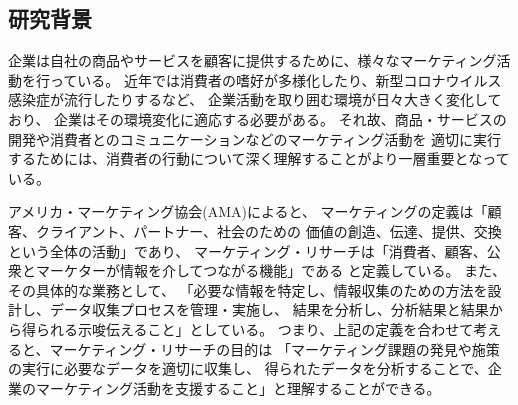 
\subsection{研究背景}

企業は自社の商品やサービスを顧客に提供するために、様々なマーケティング活動を行っている。
近年では消費者の嗜好が多様化したり、新型コロナウイルス感染症が流行したりするなど、
企業活動を取り囲む環境が日々大きく変化しており、
企業はその環境変化に適応する必要がある。
それ故、商品・サービスの開発や消費者とのコミュニケーションなどのマーケティング活動を
適切に実行するためには、消費者の行動について深く理解することがより一層重要となっている。

アメリカ・マーケティング協会(AMA)によると、
マーケティングの定義は「顧客、クライアント、パートナー、社会のための
価値の創造、伝達、提供、交換という全体の活動」であり、
マーケティング・リサーチは「消費者、顧客、公衆とマーケターが情報を介してつながる機能」である
と定義している\cite{AMA_marketing}。
また、その具体的な業務として、
「必要な情報を特定し、情報収集のための方法を設計し、データ収集プロセスを管理・実施し、
結果を分析し、分析結果と結果から得られる示唆伝えること」としている。
つまり、上記の定義を合わせて考えると、マーケティング・リサーチの目的は
「マーケティング課題の発見や施策の実行に必要なデータを適切に収集し、
得られたデータを分析することで、企業のマーケティング活動を支援すること」と理解することができる。


